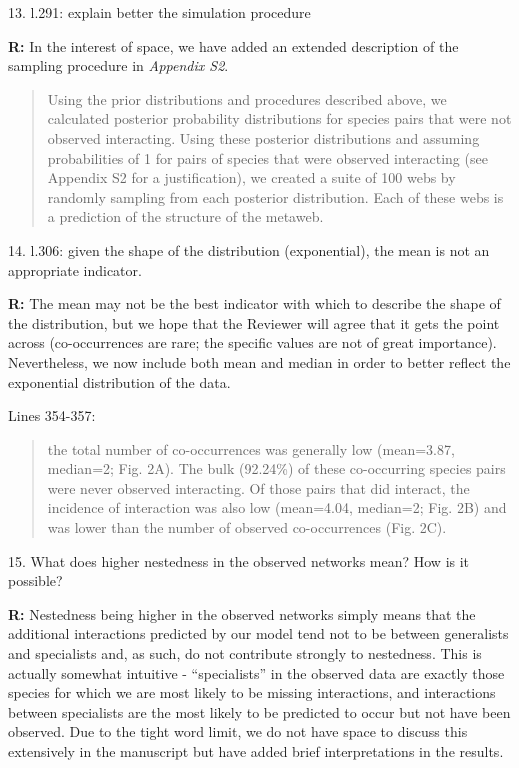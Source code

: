 \documentclass[12pt]{letter}
\begin{document}
	13. l.291: explain better the simulation procedure
	

		\textbf{R:} In the interest of space, we have added an extended description of the sampling procedure in \emph{Appendix S2}. 


		\begin{quotation}
			Using the prior distributions and procedures described above, we calculated posterior probability distributions for species pairs that were not observed interacting. Using these posterior distributions and assuming probabilities of 1 for pairs of species that were observed interacting (see Appendix S2 for a justification), we created a suite of 100 webs by randomly sampling from each posterior distribution. Each of these webs is a prediction of the structure of the metaweb.
		\end{quotation}


	14. l.306: given the shape of the distribution (exponential), the mean is not an appropriate indicator. 


		\textbf{R:} The mean may not be the best indicator with which to describe the shape of the distribution, but we hope that the Reviewer will agree that it gets the point across (co-occurrences are rare; the specific values are not of great importance). Nevertheless, we now include both mean and median in order to better reflect the exponential distribution of the data.


		Lines 354-357:


		\begin{quotation}
			the total number of co-occurrences was generally low (mean=3.87, median=2; Fig. 2A). The bulk (92.24\%) of these co-occurring species pairs were never observed interacting. Of those pairs that did interact, the incidence of interaction was also low (mean=4.04, median=2; Fig. 2B) and was lower than the number of observed co-occurrences (Fig. 2C).
		\end{quotation}


	15. What does higher nestedness in the observed networks mean? How is it possible? 


		\textbf{R:} Nestedness being higher in the observed networks simply means that the additional interactions predicted by our model tend not to be between generalists and specialists and, as such, do not contribute strongly to nestedness. This is actually somewhat intuitive - ``specialists'' in the observed data are exactly those species for which we are most likely to be missing interactions, and interactions between specialists are the most likely to be predicted to occur but not have been observed. Due to the tight word limit, we do not have space to discuss this extensively in the manuscript but have added brief interpretations in the results.
\end{document}
